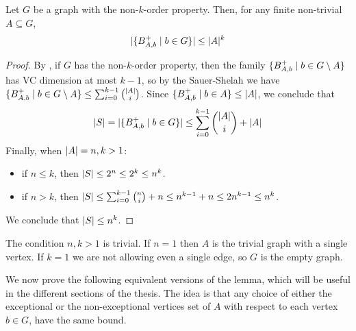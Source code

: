     \begin{lemma}[Claim 2.6] \label{lem:k_order_property_bounds_BAbs}
        Let $G$ be a graph with the non-$k$-order property.
        Then, for any finite non-trivial $A \subseteq G$,
        \[
            | \{ B^+_{A,b} \mid b \in G \} | \leq |A|^k
        \]
        \begin{proof}
            By , if $G$ has the non-$k$-order property,
            then the family $\{ B^+_{A,b} \mid b \in G \setminus A \}$ has VC dimension at most $k-1$,
            so by the Sauer-Shelah  we have
            $\{ B^+_{A,b} \mid b \in G \setminus A \} \leq \sum_{i=0}^{k-1} \binom{|A|}{i}$.
            Since $\{ B^+_{A,b} \mid b \in A \} \leq | A |$, we conclude that
            \[
                | S | = | \{ B^+_{A,b} \mid b \in G \} | \leq \sum_{i=0}^{k-1} \binom{|A|}{i} + |A|
            \]
            Finally, when $| A | = n,k > 1$: 
            \begin{itemize}
                \item if $n \leq k$, then $| S | \leq 2^n \leq 2^k \leq n^k$.
                \item if $n > k$, then $| S | \leq \sum_{i=0}^{k-1} {n \choose i} + n \leq n^{k-1} + n \leq 2n^{k-1} \leq n^k$.
            \end{itemize}
            We conclude that $| S | \leq n^k$.
        \end{proof}
    \end{lemma}

    \begin{remark}
        The condition $n,k > 1$ is trivial.
        If $n=1$ then $A$ is the trivial graph with a single vertex.
        If $k=1$ we are not allowing even a single edge, so $G$ is the empty graph.
    \end{remark}

    We now prove the following equivalent versions of the lemma, which will be useful in the different sections of the
    thesis.
    The idea is that any choice of either the exceptional or the non-exceptional vertices set of $A$ with respect to
    each vertex $b \in G$, have the same bound.

